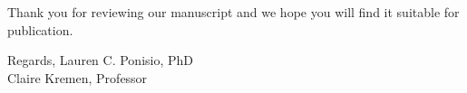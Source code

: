 \documentclass[12pt]{letter}
\begin{document}
\begin{letter}{}
  Thank you for reviewing our manuscript and we hope you will find it
  suitable for publication.
  
  Regards,
  Lauren C. Ponisio, PhD\\
  Claire Kremen, Professor
\end{letter}
\end{document}
